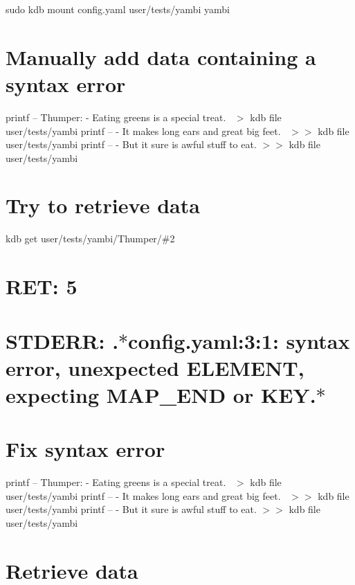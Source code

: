 sudo kdb mount config.\+yaml user/tests/yambi yambi

\section*{Manually add data containing a syntax error}

printf -- \textquotesingle{}Thumper\+: -\/ Eating greens is a special treat.~\newline
\textquotesingle{} $>$ {\ttfamily kdb file user/tests/yambi} printf -- \textquotesingle{} -\/ It makes long ears and great big feet.~\newline
\textquotesingle{} $>$$>$ {\ttfamily kdb file user/tests/yambi} printf -- \textquotesingle{}-\/ But it sure is awful stuff to eat.\textquotesingle{} $>$$>$ {\ttfamily kdb file user/tests/yambi}

\section*{Try to retrieve data}

kdb get user/tests/yambi/\+Thumper/\#2 \section*{R\+ET\+: 5}

\section*{S\+T\+D\+E\+RR\+: .$\ast$config.yaml\+:3\+:1\+: syntax error, unexpected E\+L\+E\+M\+E\+NT, expecting M\+A\+P\+\_\+\+E\+ND or K\+EY.$\ast$}

\section*{Fix syntax error}

printf -- \textquotesingle{}Thumper\+: -\/ Eating greens is a special treat.~\newline
\textquotesingle{} $>$ {\ttfamily kdb file user/tests/yambi} printf -- \textquotesingle{} -\/ It makes long ears and great big feet.~\newline
\textquotesingle{} $>$$>$ {\ttfamily kdb file user/tests/yambi} printf -- \textquotesingle{} -\/ But it sure is awful stuff to eat.\textquotesingle{} $>$$>$ {\ttfamily kdb file user/tests/yambi}

\section*{Retrieve data}

